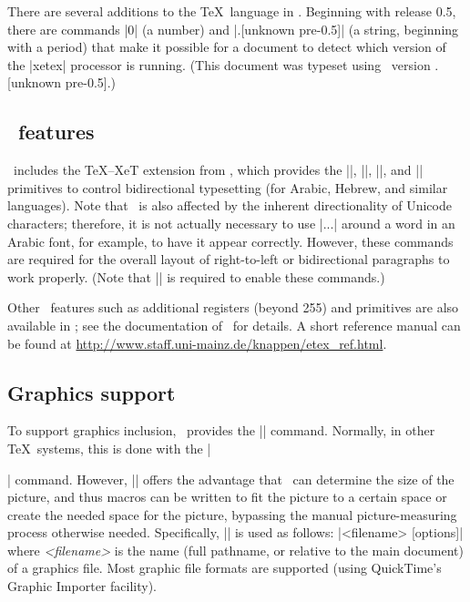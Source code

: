 \ifx\XeTeXversion\undefined {} \def\XeTeXrevision{.[unknown pre-0.5]} \fi

\the\XeTeXversion 

There are several additions to the \TeX\ language in \XeTeX. 
Beginning with release 0.5, there are commands |\XeTeXversion| (a number) and |\XeTeXrevision| (a string, beginning with a period) that make it possible for a document to detect which version of the |xetex| processor is running. (This document was typeset using \XeTeX\ version \number\XeTeXversion\XeTeXrevision.)

\subsection{\eTeX\ features}

\XeTeX\ includes the TeX--XeT extension from \eTeX, which provides the |\beginL|, |\endL|, |\beginR|, and |\endR| primitives to control bidirectional typesetting (for Arabic, Hebrew, and similar languages). Note that \XeTeX\ is also affected by the inherent directionality of Unicode characters; therefore, it is not actually necessary to use |\beginR...\endR| around a word in an Arabic font, for example, to have it appear correctly. However, these commands are required for the overall layout of right-to-left or bidirectional paragraphs to work properly. (Note that || is required to enable these commands.)

Other \eTeX\ features such as additional registers (beyond 255) and primitives are also available in \XeTeX; see the documentation of \eTeX\ for details. A short reference manual can be found at \url{http://www.staff.uni-mainz.de/knappen/etex_ref.html}.

\subsection{Graphics support}

To support graphics inclusion, \XeTeX\ provides the |\XeTeXpicfile| command. Normally, in other \TeX\ systems, this is done with the |\special| command. However, |\XeTeXpicfile| offers the advantage that \XeTeX\ can determine the size of the picture, and thus macros can be written to fit the picture to a certain space or create the needed space for the picture, bypassing the manual picture-measuring process otherwise needed. Specifically, |\XeTeXpicfile| is used as follows:\hfil\break\indent\indent
  |\XeTeXpicfile <filename> [options]|\hfil\break
where {\em<filename>} is the name (full pathname, or relative to the main document) of a graphics file. Most graphic file formats are supported (using QuickTime's Graphic Importer facility).

